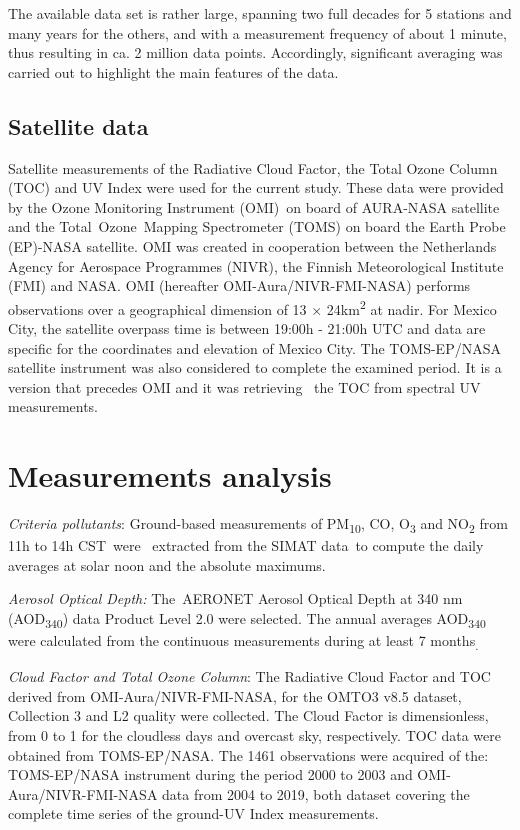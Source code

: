 \documentclass{article}
\begin{document}
{The available data set is rather large, spanning two full decades for 5
stations and many years for the others, and with a measurement frequency
of about 1 minute, thus resulting in ca. 2 million data points.
Accordingly, significant averaging was carried out to highlight the main
features of the data.

\subsection*{Satellite data}

Satellite measurements of the Radiative Cloud Factor, the Total Ozone
Column (TOC) and UV Index were used for the current study. These data
were provided by the Ozone Monitoring Instrument (OMI)~on board of
AURA-NASA satellite and the Total~Ozone~Mapping Spectrometer (TOMS) on
board the Earth Probe (EP)-NASA satellite. OMI was created in
cooperation between the Netherlands Agency for Aerospace Programmes
(NIVR), the Finnish Meteorological Institute (FMI) and NASA. OMI
(hereafter OMI-Aura/NIVR-FMI-NASA) performs observations over a
geographical dimension of 13 × 24km\textsuperscript{2} at nadir. For
Mexico City, the satellite overpass time is between 19:00h - 21:00h UTC
and data are specific for the coordinates and elevation of Mexico City.
The TOMS-EP/NASA satellite instrument was also considered to complete
the examined period. It is a version that precedes OMI and it was
retrieving~ the TOC from spectral UV measurements. ~

\section*{Measurements analysis}


\emph{Criteria pollutants}{: Ground-based measurements of
PM}\textsubscript{10}{, CO, O}\textsubscript{3}{ and
NO}\textsubscript{2}{ from 11h to 14h CST~were~} extracted from the
SIMAT data{~to compute the daily averages at solar noon and the absolute
maximums.}

\emph{Aerosol Optical Depth:} The~AERONET Aerosol Optical Depth at 340
nm (AOD\textsubscript{340}) data Product Level 2.0 were selected. The
annual averages AOD\textsubscript{340} were calculated from the
continuous measurements during at least 7 months\textsubscript{.}

\emph{Cloud Factor and Total Ozone Column}: The Radiative Cloud Factor
and TOC derived from OMI-Aura/NIVR-FMI-NASA, for the OMTO3 v8.5 dataset,
Collection 3 and L2 quality were collected. The Cloud Factor is
dimensionless, from 0 to 1 for the cloudless days and overcast sky,
respectively. TOC data were obtained from TOMS-EP/NASA. The 1461
observations were acquired of the: TOMS-EP/NASA instrument during the
period 2000 to 2003 and OMI-Aura/NIVR-FMI-NASA data from 2004 to 2019,
both dataset covering the complete time series of the ground-UV Index
measurements.

}
\end{document}
